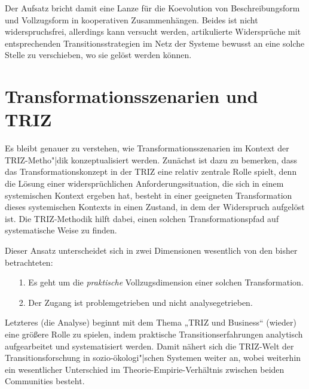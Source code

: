 \documentclass[12pt,a4paper]{article}
\begin{document}
Der Aufsatz bricht damit eine Lanze für die Koevolution von Beschreibungsform
und Vollzugsform in kooperativen Zusammenhängen. Beides ist nicht
widerspruchsfrei, allerdings kann versucht werden, artikulierte Widersprüche
mit entsprechenden Transitionsstrategien im Netz der Systeme bewusst an eine
solche Stelle zu verschieben, wo sie gelöst werden können.

\section{Transformationsszenarien und TRIZ}

Es bleibt genauer zu verstehen, wie Transformationsszenarien im Kontext der
TRIZ-Metho"|dik konzeptualisiert werden.  Zunächst ist dazu zu bemerken, dass
das Transformationskonzept in der TRIZ eine relativ zentrale Rolle spielt,
denn die Lösung einer widersprüchlichen Anforderungssituation, die sich in
einem systemischen Kontext ergeben hat, besteht in einer geeigneten
Transformation dieses systemischen Kontexts in einen Zustand, in dem der
Widerspruch aufgelöst ist.  Die TRIZ-Methodik hilft dabei, einen solchen
Transformationspfad auf systematische Weise zu finden.

Dieser Ansatz unterscheidet sich in zwei Dimensionen wesentlich von den bisher
betrachteten:
\begin{itemize}
\item[1.] Es geht um die \emph{praktische} Vollzugsdimension einer solchen
  Transformation.
\item[2.] Der Zugang ist problemgetrieben und nicht analysegetrieben.
\end{itemize}
Letzteres (die Analyse) beginnt mit dem Thema „TRIZ und Business“ (wieder)
eine größere Rolle zu spielen, indem praktische Transitionserfahrungen
analytisch aufgearbeitet und systematisiert werden. Damit nähert sich die
TRIZ-Welt der Transitionsforschung in sozio-ökologi"|schen Systemen weiter an,
wobei weiterhin ein wesentlicher Unterschied im Theorie-Empirie-Verhältnis
zwischen beiden Communities besteht.
\end{document}
